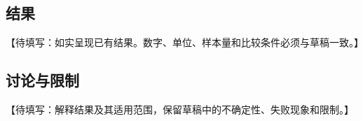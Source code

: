\subsection{结果}\label{sec:result-details}

【待填写：如实呈现已有结果。数字、单位、样本量和比较条件必须与草稿一致。】

\subsection{讨论与限制}\label{sec:discussion}

【待填写：解释结果及其适用范围，保留草稿中的不确定性、失败现象和限制。】
